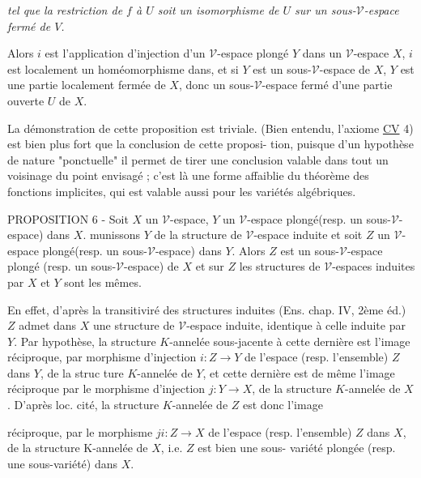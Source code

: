 \newpage



\emph{tel que la restriction de $f$ à $U$ soit un isomorphisme de $U$ sur un sous-$\mathcal{V}$-espace fermé de $V$.}

Alors $i$ est l'application d'injection d'un $\mathcal{V}$-espace plongé $Y$
dans un $\mathcal{V}$-espace $X$, $i$ est localement un homéomorphisme dans, et si $Y$
est un sous-$\mathcal{V}$-espace de $X$, $Y$ est une partie localement fermée de $X$,
donc un sous-$\mathcal{V}$-espace fermé d'une partie ouverte $U$ de $X$.

La démonstration de cette proposition est triviale. (Bien entendu,
l'axiome \underline{CV} 4) est bien plus fort que la conclusion de cette proposi-
tion, puisque d'un hypothèse de nature "ponctuelle" il permet de tirer
une conclusion valable dans tout un voisinage du point envisagé ; c'est
là une forme affaiblie du théorème des fonctions implicites, qui est
valable aussi pour les variétés algébriques.

PROPOSITION 6 - Soit $X$ un $\mathcal{V}$-espace, $Y$ un $\mathcal{V}$-espace plongé(resp. un
sous-$\mathcal{V}$-espace) dans $X$. munissons $Y$ de la structure de $\mathcal{V}$-espace
induite et soit $Z$ un $\mathcal{V}$-espace plongé(resp. un sous-$\mathcal{V}$-espace) dans
$Y$. Alors $Z$ est un sous-$\mathcal{V}$-espace plongé (resp. un sous-$\mathcal{V}$-espace) de
$X$ et sur $Z$ les structures de $\mathcal{V}$-espaces induites par $X$ et $Y$ sont les
mêmes.

En effet, d'après la transitiviré des structures induites (Ens.
chap. IV, 2ème éd.) $Z$ admet dans $X$ une structure de $\mathcal{V}$-espace induite,
identique à celle induite par $Y$. Par hypothèse, la structure $K$-annelée
sous-jacente à cette dernière est l'image réciproque, par morphisme
d'injection $i:Z \to Y$ de l'espace (resp. l'ensemble) $Z$ dans $Y$, de la struc
ture $K$-annelée de $Y$, et cette dernière est de même l'image réciproque
par le morphisme d'injection $j:Y \to X$, de la structure $K$-annelée de $X$.
D'après loc. cité, la structure $K$-annelée de $Z$ est donc l'image

\newpage



réciproque, par le morphisme $j i : Z \to X$ de l'espace (resp. l'ensemble)
$Z$ dans $X$, de la structure K-annelée de $X$, i.e. $Z$ est bien une sous-
variété plongée (resp. une sous-variété) dans $X$.

